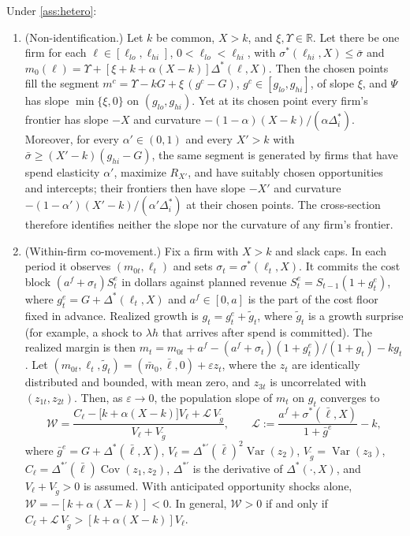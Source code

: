 \begin{proposition}\label{prop:industry-full}
Under \autoref{ass:hetero}:
\begin{enumerate}
\item[(iv)] (Non-identification.) Let $k$ be common, $X>k$, and $\xi,\Upsilon\in\mathbb R$. Let there be one firm for each $\ell\in[\ell_{lo},\ell_{hi}]$, $0<\ell_{lo}<\ell_{hi}$, with $\sigma^*(\ell_{hi},X)\le\bar\sigma$ and $m_0(\ell)=\Upsilon+[\xi+k+\alpha(X-k)]\Delta^*(\ell,X)$. Then the chosen points fill the segment $m^c=\Upsilon-kG+\xi\,(g^c-G)$, $g^c\in[g_{lo},g_{hi}]$, of slope $\xi$, and $\Psi$ has slope $\min\{\xi,0\}$ on $(g_{lo},g_{hi})$. Yet at its chosen point every firm's frontier has slope $-X$ and curvature $-(1-\alpha)(X-k)/(\alpha\Delta_i^*)$. Moreover, for every $\alpha'\in(0,1)$ and every $X'>k$ with $\bar\sigma\ge(X'-k)(g_{hi}-G)$, the same segment is generated by firms that have spend elasticity $\alpha'$, maximize $R_{X'}$, and have suitably chosen opportunities and intercepts; their frontiers then have slope $-X'$ and curvature $-(1-\alpha')(X'-k)/(\alpha'\Delta_i^*)$ at their chosen points. The cross-section therefore identifies neither the slope nor the curvature of any firm's frontier.
\item[(v)] (Within-firm co-movement.) Fix a firm with $X>k$ and slack caps. In each period it observes $(m_{0t},\ell_t)$ and sets $\sigma_t=\sigma^*(\ell_t,X)$. It commits the cost block $(a^f+\sigma_t)S_t^e$ in dollars against planned revenue $S_t^e=S_{t-1}(1+g_t^e)$, where $g_t^e=G+\Delta^*(\ell_t,X)$ and $a^f\in[0,a]$ is the part of the cost floor fixed in advance. Realized growth is $g_t=g_t^e+\tilde g_t$, where $\tilde g_t$ is a growth surprise (for example, a shock to $\lambda h$ that arrives after spend is committed). The realized margin is then $m_t=m_{0t}+a^f-(a^f+\sigma_t)(1+g_t^e)/(1+g_t)-kg_t$. Let $(m_{0t},\ell_t,\tilde g_t)=(\bar m_0,\bar\ell,0)+\varepsilon z_t$, where the $z_t$ are identically distributed and bounded, with mean zero, and $z_{3t}$ is uncorrelated with $(z_{1t},z_{2t})$. Then, as $\varepsilon\to 0$, the population slope of $m_t$ on $g_t$ converges to
\begin{equation}\label{eq:bW}
\mathcal W=\frac{C_\ell-\bigl[k+\alpha(X-k)\bigr]V_\ell+\mathcal L\,V_{\tilde g}}{V_\ell+V_{\tilde g}},\qquad \mathcal L:=\frac{a^f+\sigma^*(\bar\ell,X)}{1+\bar g^e}-k,
\end{equation}
where $\bar g^e=G+\Delta^*(\bar\ell,X)$, $V_\ell=\Delta^{*\prime}(\bar\ell)^2\operatorname{Var}(z_2)$, $V_{\tilde g}=\operatorname{Var}(z_3)$, $C_\ell=\Delta^{*\prime}(\bar\ell)\operatorname{Cov}(z_1,z_2)$, $\Delta^{*\prime}$ is the derivative of $\Delta^*(\cdot,X)$, and $V_\ell+V_{\tilde g}>0$ is assumed. With anticipated opportunity shocks alone, $\mathcal W=-[k+\alpha(X-k)]<0$. In general, $\mathcal W>0$ if and only if $C_\ell+\mathcal L\,V_{\tilde g}>[k+\alpha(X-k)]V_\ell$.
\end{enumerate}
\end{proposition}

